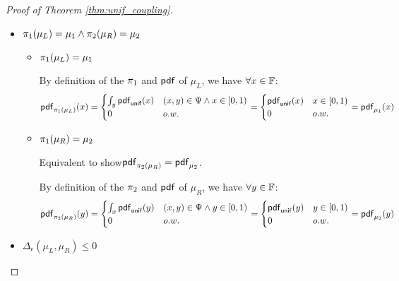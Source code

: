 \documentclass[a4paper,11pt]{article}
\begin{document}
\begin{proof}[Proof of Theorem \ref{thm:unif_coupling}]
\begin{itemize}
	\item $\pi_1(\mu_L) = \mu_1 \land \pi_2(\mu_R) = \mu_2$
	
	\begin{itemize}
		\item $\pi_1(\mu_L) = \mu_1$ 


		By definition of the $\pi_1$ and $\mathsf{pdf}$ of $\mu_L$, we have $\forall x \in \mathbb{F}$:
		\[
			\mathsf{pdf}_{\pi_1(\mu_L)}(x) = 
			\begin{cases}
			\int_{y}\mathsf{pdf}_{\mathsf{unif}}(x) & (x,y) \in \Psi \land x \in [0, 1)\\
			0       & o.w.
			\end{cases} 
			= 
			\begin{cases}
			\mathsf{pdf}_{\mathsf{unif}}(x) & x \in [0, 1)\\
			0       & o.w.
			\end{cases}
			=
			\mathsf{pdf}_{\mu_1}(x)
		\]

		\item $\pi_1(\mu_R) = \mu_2$ 

		Equivalent to show$\mathsf{pdf}_{\pi_2(\mu_R)}  = \mathsf{pdf}_{\mu_2}$.

		By definition of the $\pi_2$ and $\mathsf{pdf}$ of $\mu_R$, we have $\forall y \in \mathbb{F}$:
		\[
			\mathsf{pdf}_{\pi_2(\mu_R)}(y) = 
			\begin{cases}
			\int_{x}\mathsf{pdf}_{\mathsf{unif}}(y) & (x,y) \in \Psi \land y \in [0, 1)\\
			0       & o.w.
			\end{cases} 
			= 
			\begin{cases}
			\mathsf{pdf}_{\mathsf{unif}}(y) & y \in [0, 1)\\
			0       & o.w.
			\end{cases}
			=
			\mathsf{pdf}_{\mu_2}(y)
		\]
	\end{itemize}	

	\item $\Delta_{\epsilon}(\mu_L, \mu_R) \leq 0$


\end{itemize}
\end{proof}
\end{document}
